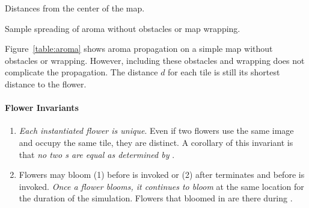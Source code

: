 \documentclass{pset}
\begin{document}
\begin{table}[H]
  \centering
  \caption{Distances from the center of the map.}
  \label{table:manhattan}
\end{table}

\begin{table}[H]
  \centering
  \caption{Sample spreading of aroma without obstacles or map wrapping.}
  \label{table:aroma}
\end{table}

Figure~\ref{table:aroma} shows aroma propagation on a simple map without
obstacles or wrapping. However, including these obstacles and wrapping does not
complicate the propagation. The distance $d$ for each tile is still its
shortest distance to the flower. 

\paragraph{Flower Invariants}
\begin{enumerate}
    \item \emph{Each instantiated flower is unique}. Even if two flowers use
      the same image and occupy the same tile, they are distinct. A corollary
      of this invariant is that \emph{no two s are equal as
      determined by }.  
    \item Flowers may bloom (1) before  is invoked or (2) after
         terminates and before  is invoked. \emph{Once a
        flower blooms, it continues to bloom} at the same location for the
        duration of the simulation. Flowers that bloomed in  are
        there during .
\end{enumerate}
\end{document}
